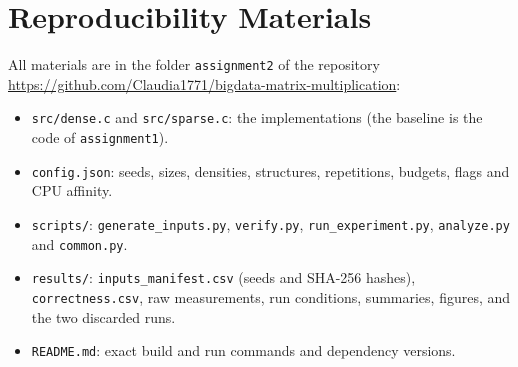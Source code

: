 \documentclass[12pt,a4paper]{report}
\begin{document}
\chapter*{Reproducibility Materials}

All materials are in the folder \texttt{assignment2} of the repository
\url{https://github.com/Claudia1771/bigdata-matrix-multiplication}:
\begin{itemize}
  \item \texttt{src/dense.c} and \texttt{src/sparse.c}: the implementations (the baseline is the code of
  \texttt{assignment1}).
  \item \texttt{config.json}: seeds, sizes, densities, structures, repetitions, budgets, flags and CPU affinity.
  \item \texttt{scripts/}: \texttt{generate\_inputs.py}, \texttt{verify.py}, \texttt{run\_experiment.py},
  \texttt{analyze.py} and \texttt{common.py}.
  \item \texttt{results/}: \texttt{inputs\_manifest.csv} (seeds and SHA-256 hashes), \texttt{correctness.csv}, raw
  measurements, run conditions, summaries, figures, and the two discarded runs.
  \item \texttt{README.md}: exact build and run commands and dependency versions.
\end{itemize}
\end{document}
